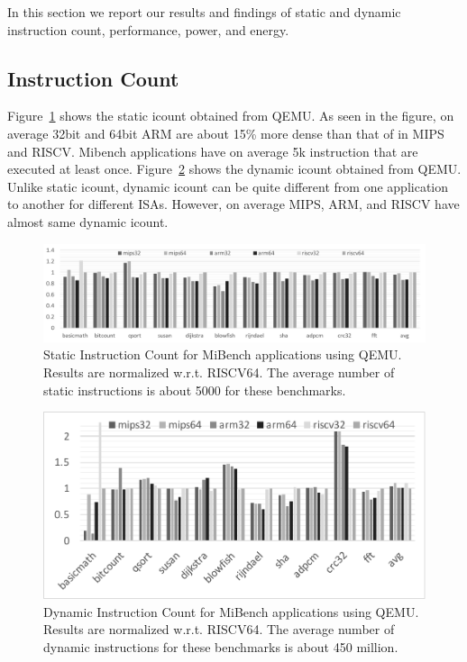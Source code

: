 In this section we report our results and findings of static and dynamic instruction count, performance, power, and energy. 

\subsection{Instruction Count}
Figure~\ref{fig:static} shows the static icount obtained from QEMU. As seen in the figure, on average 32bit and 64bit ARM are about 15\% more dense than that of in MIPS and RISCV. Mibench applications have on average 5k instruction that are executed at least once. Figure~\ref{fig:dynamic} shows the dynamic icount obtained from QEMU. Unlike static icount, dynamic icount can be quite different from one application to another for different ISAs. However, on average MIPS, ARM, and RISCV have almost same dynamic icount. 

\begin{figure}[htb]
	\centering
	\includegraphics[width=1.9\columnwidth]{figures/static.pdf}
	\caption{Static Instruction Count for MiBench applications using QEMU. Results are normalized w.r.t. RISCV64. The average number of static instructions is about 5000 for these benchmarks.}
	\label{fig:static}
\end{figure} 

\begin{figure}[htb]
	\centering
	\includegraphics[width=1\columnwidth]{figures/dynamic.pdf}
	\caption{Dynamic Instruction Count for MiBench applications using QEMU. Results are normalized w.r.t. RISCV64. The average number of dynamic instructions for these benchmarks is about 450 million.}
	\label{fig:dynamic}
	\vspace{-1em}
\end{figure} 

